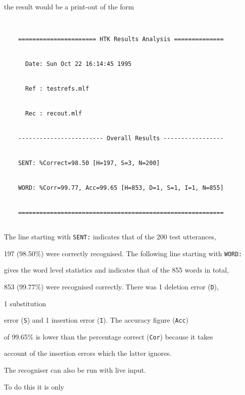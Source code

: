 the result would be a print-out of the form


\begin{verbatim}


    ====================== HTK Results Analysis ==============


      Date: Sun Oct 22 16:14:45 1995


      Ref : testrefs.mlf


      Rec : recout.mlf


    ------------------------ Overall Results -----------------


    SENT: %Correct=98.50 [H=197, S=3, N=200]


    WORD: %Corr=99.77, Acc=99.65 [H=853, D=1, S=1, I=1, N=855]


    ==========================================================


\end{verbatim}


The line starting with \texttt{SENT:} indicates that of the 200 test utterances,


197  (98.50\%) were correctly recognised.  The following line starting with \texttt{WORD:} 


gives the word level statistics and indicates that of the 855 words in total,


853 (99.77\%) were recognised correctly.  There was 1 deletion error (\texttt{D}), 


1 substitution


error (\texttt{S}) and 1 insertion error (\texttt{I}).  The accuracy figure (\texttt{Acc})


of 99.65\% is lower than the percentage correct (\texttt{Cor}) because it takes


account of the insertion errors which the latter ignores.















The recogniser can also be run with live input.  




To do this it is only


